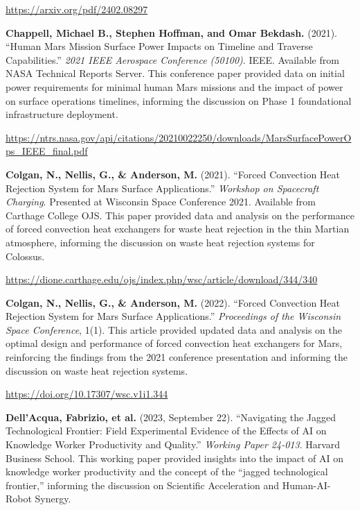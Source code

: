 \documentclass[fontsize=10pt, oneside, DIV=calc]{scrartcl}
\begin{document}
\href{https://arxiv.org/pdf/2402.08297}{\url{https://arxiv.org/pdf/2402.08297}}

\vspace{1em}
\noindent \textbf{Chappell, Michael B., Stephen Hoffman, and Omar Bekdash.} (2021). ``Human Mars Mission Surface Power Impacts on Timeline and Traverse Capabilities.'' \textit{2021 IEEE Aerospace Conference (50100)}. IEEE. Available from NASA Technical Reports Server. This conference paper provided data on initial power requirements for minimal human Mars missions and the impact of power on surface operations timelines, informing the discussion on Phase 1 foundational infrastructure deployment. 



\href{https://ntrs.nasa.gov/api/citations/20210022250/downloads/MarsSurfacePowerOps\_IEEE\_final.pdf}{\url{https://ntrs.nasa.gov/api/citations/20210022250/downloads/MarsSurfacePowerOps\_IEEE\_final.pdf}}

\vspace{1em}
\noindent \textbf{Colgan, N., Nellis, G., \& Anderson, M.} (2021). ``Forced Convection Heat Rejection System for Mars Surface Applications.'' \textit{Workshop on Spacecraft Charging}. Presented at Wisconsin Space Conference 2021. Available from Carthage College OJS. This paper provided data and analysis on the performance of forced convection heat exchangers for waste heat rejection in the thin Martian atmosphere, informing the discussion on waste heat rejection systems for Colossus. 



\href{https://dione.carthage.edu/ojs/index.php/wsc/article/download/344/340}{\url{https://dione.carthage.edu/ojs/index.php/wsc/article/download/344/340}}

\vspace{1em}
\noindent \textbf{Colgan, N., Nellis, G., \& Anderson, M.} (2022). ``Forced Convection Heat Rejection System for Mars Surface Applications.'' \textit{Proceedings of the Wisconsin Space Conference}, 1(1). This article provided updated data and analysis on the optimal design and performance of forced convection heat exchangers for Mars, reinforcing the findings from the 2021 conference presentation and informing the discussion on waste heat rejection systems. 



\href{https://doi.org/10.17307/wsc.v1i1.344}{\url{https://doi.org/10.17307/wsc.v1i1.344}}

\vspace{1em}
\noindent \textbf{Dell’Acqua, Fabrizio, et al.} (2023, September 22). ``Navigating the Jagged Technological Frontier: Field Experimental Evidence of the Effects of AI on Knowledge Worker Productivity and Quality.'' \textit{Working Paper 24-013}. Harvard Business School. This working paper provided insights into the impact of AI on knowledge worker productivity and the concept of the ``jagged technological frontier,'' informing the discussion on Scientific Acceleration and Human-AI-Robot Synergy. 
\end{document}
